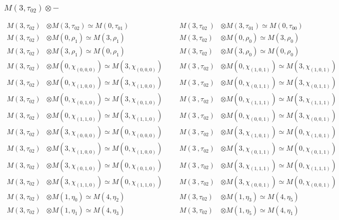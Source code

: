 \subsubsection{$M(3,\tau_{02})\otimes -$}
\begin{align*}
M(3,\tau_{02}) &\otimes M(3,\tau_{02}) \simeq M(0,\tau_{01}) &&& M(3,\tau_{02}\
) &\otimes M(3,\tau_{01}) \simeq M(0,\tau_{00})\\
M(3,\tau_{02}) &\otimes M(0,\rho_{1}) \simeq M(3,\rho_{1}) &&& M(3,\tau_{02}) \
&\otimes M(0,\rho_{0}) \simeq M(3,\rho_{0})\\
M(3,\tau_{02}) &\otimes M(3,\rho_{1}) \simeq M(0,\rho_{1}) &&& M(3,\tau_{02}) \
&\otimes M(3,\rho_{0}) \simeq M(0,\rho_{0})\\
M(3,\tau_{02}) &\otimes M(0,\chi_{(0,0,0)}) \simeq M(3,\chi_{(0,0,0)}) &&& M(3\
,\tau_{02}) &\otimes M(0,\chi_{(1,0,1)}) \simeq M(3,\chi_{(1,0,1)})\\
M(3,\tau_{02}) &\otimes M(0,\chi_{(1,0,0)}) \simeq M(3,\chi_{(1,0,0)}) &&& M(3\
,\tau_{02}) &\otimes M(0,\chi_{(0,1,1)}) \simeq M(3,\chi_{(0,1,1)})\\
M(3,\tau_{02}) &\otimes M(0,\chi_{(0,1,0)}) \simeq M(3,\chi_{(0,1,0)}) &&& M(3\
,\tau_{02}) &\otimes M(0,\chi_{(1,1,1)}) \simeq M(3,\chi_{(1,1,1)})\\
M(3,\tau_{02}) &\otimes M(0,\chi_{(1,1,0)}) \simeq M(3,\chi_{(1,1,0)}) &&& M(3\
,\tau_{02}) &\otimes M(0,\chi_{(0,0,1)}) \simeq M(3,\chi_{(0,0,1)})\\
M(3,\tau_{02}) &\otimes M(3,\chi_{(0,0,0)}) \simeq M(0,\chi_{(0,0,0)}) &&& M(3\
,\tau_{02}) &\otimes M(3,\chi_{(1,0,1)}) \simeq M(0,\chi_{(1,0,1)})\\
M(3,\tau_{02}) &\otimes M(3,\chi_{(1,0,0)}) \simeq M(0,\chi_{(1,0,0)}) &&& M(3\
,\tau_{02}) &\otimes M(3,\chi_{(0,1,1)}) \simeq M(0,\chi_{(0,1,1)})\\
M(3,\tau_{02}) &\otimes M(3,\chi_{(0,1,0)}) \simeq M(0,\chi_{(0,1,0)}) &&& M(3\
,\tau_{02}) &\otimes M(3,\chi_{(1,1,1)}) \simeq M(0,\chi_{(1,1,1)})\\
M(3,\tau_{02}) &\otimes M(3,\chi_{(1,1,0)}) \simeq M(0,\chi_{(1,1,0)}) &&& M(3\
,\tau_{02}) &\otimes M(3,\chi_{(0,0,1)}) \simeq M(0,\chi_{(0,0,1)})\\
M(3,\tau_{02}) &\otimes M(1,\eta_{0}) \simeq M(4,\eta_{2}) &&& M(3,\tau_{02}) \
&\otimes M(1,\eta_{3}) \simeq M(4,\eta_{5})\\
M(3,\tau_{02}) &\otimes M(1,\eta_{1}) \simeq M(4,\eta_{3}) &&& M(3,\tau_{02}) \
&\otimes M(1,\eta_{5}) \simeq M(4,\eta_{1})\\

\end{align*}
